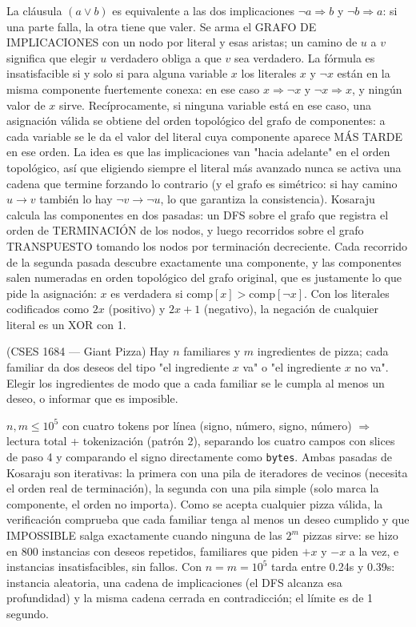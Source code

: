  La cláusula $(a \lor b)$ es equivalente a las dos implicaciones $\lnot a \Rightarrow b$ y $\lnot b \Rightarrow a$: si una parte falla, la otra tiene que valer. Se arma el GRAFO DE IMPLICACIONES con un nodo por literal y esas aristas; un camino de $u$ a $v$ significa que elegir $u$ verdadero obliga a que $v$ sea verdadero. La fórmula es insatisfacible si y solo si para alguna variable $x$ los literales $x$ y $\lnot x$ están en la misma componente fuertemente conexa: en ese caso $x \Rightarrow \lnot x$ y $\lnot x \Rightarrow x$, y ningún valor de $x$ sirve. Recíprocamente, si ninguna variable está en ese caso, una asignación válida se obtiene del orden topológico del grafo de componentes: a cada variable se le da el valor del literal cuya componente aparece MÁS TARDE en ese orden. La idea es que las implicaciones van "hacia adelante" en el orden topológico, así que eligiendo siempre el literal más avanzado nunca se activa una cadena que termine forzando lo contrario (y el grafo es simétrico: si hay camino $u \to v$ también lo hay $\lnot v \to \lnot u$, lo que garantiza la consistencia). Kosaraju calcula las componentes en dos pasadas: un DFS sobre el grafo que registra el orden de TERMINACIÓN de los nodos, y luego recorridos sobre el grafo TRANSPUESTO tomando los nodos por terminación decreciente. Cada recorrido de la segunda pasada descubre exactamente una componente, y las componentes salen numeradas en orden topológico del grafo original, que es justamente lo que pide la asignación: $x$ es verdadera si $\text{comp}[x] > \text{comp}[\lnot x]$. Con los literales codificados como $2x$ (positivo) y $2x+1$ (negativo), la negación de cualquier literal es un XOR con 1.~\cite{aspvall1979}


(CSES 1684 — Giant Pizza) Hay $n$ familiares y $m$ ingredientes de pizza; cada familiar da dos deseos del tipo "el ingrediente $x$ va" o "el ingrediente $x$ no va". Elegir los ingredientes de modo que a cada familiar se le cumpla al menos un deseo, o informar que es imposible.

 $n, m \le 10^5$ con cuatro tokens por línea (signo, número, signo, número) $\Rightarrow$ lectura total + tokenización (patrón 2), separando los cuatro campos con slices de paso 4 y comparando el signo directamente como \texttt{bytes}. Ambas pasadas de Kosaraju son iterativas: la primera con una pila de iteradores de vecinos (necesita el orden real de terminación), la segunda con una pila simple (solo marca la componente, el orden no importa). Como se acepta cualquier pizza válida, la verificación comprueba que cada familiar tenga al menos un deseo cumplido y que IMPOSSIBLE salga exactamente cuando ninguna de las $2^m$ pizzas sirve: se hizo en 800 instancias con deseos repetidos, familiares que piden $+x$ y $-x$ a la vez, e instancias insatisfacibles, sin fallos. Con $n = m = 10^5$ tarda entre \aprox{}0.24s y \aprox{}0.39s: instancia aleatoria, una cadena de  implicaciones (el DFS alcanza esa profundidad) y la misma cadena cerrada en contradicción; el límite es de 1 segundo.


